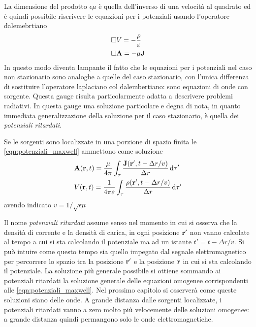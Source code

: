 La dimensione del prodotto $\epsilon\mu$ è quella dell'inverso di una velocità al quadrato ed è quindi possibile riscrivere
le equazioni per i potenziali usando l'operatore dalemebrtiano
\[
    \label{eqn:potenziali_maxwell}
    \begin{split}
        & \square V=-\frac{\rho}{\varepsilon}\\
        & \square \vb{A}=-\mu\vb{J}
    \end{split}
\]
In questo modo diventa lampante il fatto che le equazioni per i potenziali nel caso non stazionario sono analoghe
a quelle del caso stazionario, con l'unica differenza di sostituire l'operatore laplaciano col dalembertiano: sono
equazioni di onde con sorgente. Questa gauge risulta particolarmente adatta a descrivere problemi radiativi.
In questa gauge una soluzione particolare e degna di nota,
in quanto immediata generalizzazione della soluzione per il caso stazionario, è quella dei \textit{potenziali ritardati}.
\begin{thm}
    Se le sorgenti sono localizzate in una porzione di spazio finita le \eqref{eqn:potenziali_maxwell} ammettono come soluzione
    \begin{equation}
        \begin{split}
            &\vb{A}(\vb{r},t)=\frac{\mu}{4\pi}\int_{\tau}\frac{\vb{J}(\vb{r}', t-\Delta r/v)}{\Delta r}\dd{\tau'}\\
            &V(\vb{r},t)=\frac{1}{4\pi\varepsilon}\int_{\tau}\frac{\rho(\vb{r}', t-\Delta r/v)}{\Delta r}\dd{\tau'}
        \end{split}
        \label{eqn:potenziali_ritardati}
    \end{equation}
    avendo indicato $v=1/\sqrt{\epsilon\mu}$
\end{thm}
Il nome \textit{potenziali ritardati} assume senso nel momento in cui si osserva che la densità di corrente e la densità di
carica, in ogni posizione $\vb{r}'$ non vanno calcolate al tempo a cui si sta calcolando il potenziale ma ad un istante $t'=t-\Delta r/v$.
Si può intuire come questo tempo sia quello impegato dal segnale elettromagnetico per percorrere lo spazio
tra la posizione $\vb{r}'$ e la posizione $\vb{r}$ in cui si sta calcolando il potenziale.
La soluzione più generale possibile si ottiene sommando ai potenziali ritardati la soluzione generale delle equazioni omogenee corrispondenti
alle \eqref{eqn:potenziali_maxwell}. Nel prossimo capitolo si osserverà come queste soluzioni siano delle onde.
A grande distanza dalle sorgenti localizzate, i potenziali ritardati vanno a zero molto più velocemente delle soluzioni omogenee:
a grande distanza quindi permangono solo le onde elettromagnetiche.


